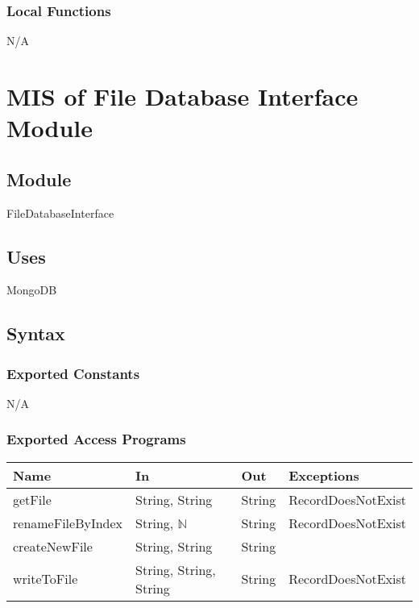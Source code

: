 \documentclass[12pt, titlepage]{article}
\begin{document}
	\subsubsection{Local Functions}
	
	N/A
	
	\newpage
	
	\section{MIS of File Database Interface Module} \label{Module}
	
	\subsection{Module}
	
	FileDatabaseInterface
	
	\subsection{Uses}
	
	MongoDB
	
	\subsection{Syntax}
	
	\subsubsection{Exported Constants}
	
	N/A
	
	\subsubsection{Exported Access Programs}
	
	\begin{center}
		\begin{tabular}{l  l  l  l}
			\hline
			\textbf{Name} & \textbf{In} & \textbf{Out} & \textbf{Exceptions} \\
			\hline
			getFile & String, String & String &  RecordDoesNotExist \\
			\hline
			renameFileByIndex & String, $\mathbb{N}$ & String &  RecordDoesNotExist \\
			\hline
			createNewFile & String, String & String &  ~ \\
			\hline
			writeToFile & String, String, String & String &  RecordDoesNotExist \\
			\hline
		\end{tabular}
	\end{center}
	
\end{document}
